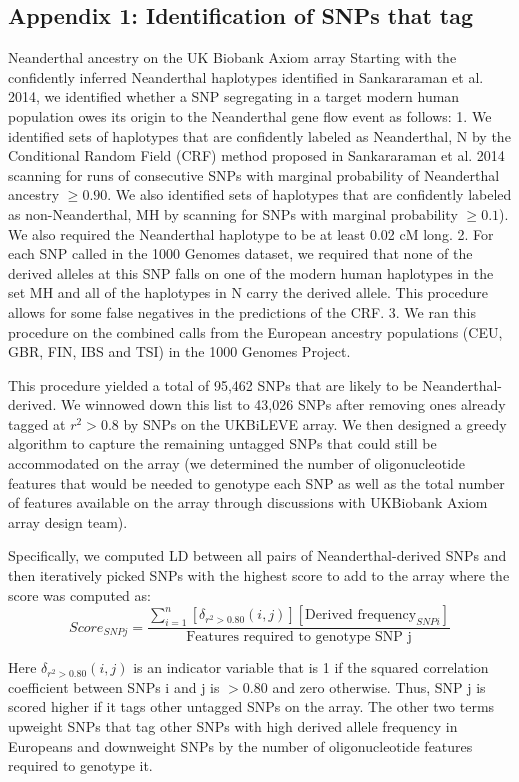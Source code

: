 \subsection{Appendix 1: Identification of SNPs that tag} Neanderthal ancestry on the UK Biobank Axiom array 
Starting with the confidently inferred Neanderthal haplotypes identified in Sankararaman et al. 2014, we identified whether a SNP segregating in a target modern human population owes its origin to the Neanderthal gene flow event as follows:
1. We identified sets of haplotypes that are confidently labeled as Neanderthal, N by the Conditional Random Field (CRF) method proposed in Sankararaman et al. 2014 scanning for runs of consecutive SNPs with marginal probability of Neanderthal ancestry $\ge0.90$. We also identified sets of haplotypes that are confidently labeled as non-Neanderthal, MH by scanning for SNPs with marginal probability $\ge0.1$). We also required the Neanderthal haplotype to be at least 0.02 cM long.
2. For each SNP called in the 1000 Genomes dataset, we required that none of the derived alleles at this SNP falls on one of the modern human haplotypes in the set MH and all of the haplotypes in N carry the derived allele. This procedure allows for some false negatives in the predictions of the CRF.
3. We ran this procedure on the combined calls from the European ancestry populations (CEU, GBR, FIN, IBS and TSI) in the 1000 Genomes Project.
 
This procedure yielded a total of 95,462 SNPs that are likely to be Neanderthal-derived. We winnowed down this list to 43,026 SNPs after removing ones already tagged at $r^2>0.8$ by SNPs on the UKBiLEVE array. We then designed a greedy algorithm to capture the remaining untagged SNPs that could still be accommodated on the array (we determined the number of oligonucleotide features that would be needed to genotype each SNP as well as the total number of features available on the array through discussions with UKBiobank Axiom array design team).

Specifically, we computed LD between all pairs of Neanderthal-derived SNPs and then iteratively picked SNPs with the highest score to add to the array where the score was computed as:
$$Score_{SNP j}  =  \frac{\sum_{i=1}^n  [\delta_{r^2>0.80}(i,j)][\text{Derived frequency}_{SNP i}]}{\text{Features required to genotype SNP j}}$$

Here $\delta_{r^2>0.80}(i,j)$ is an indicator variable that is 1 if the squared correlation coefficient between SNPs i and j is $>0.80$ and zero otherwise. Thus, SNP j is scored higher if it tags other untagged SNPs on the array. The other two terms upweight SNPs that tag other SNPs with high derived allele frequency in Europeans and downweight SNPs by the number of oligonucleotide features required to genotype it.


